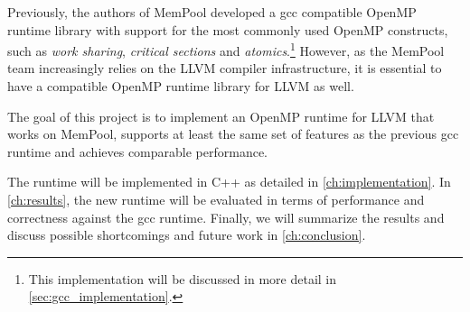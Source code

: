 Previously, the authors of MemPool developed a \gls{gcc} compatible OpenMP runtime library with
support for the most commonly used OpenMP constructs, such as \emph{work sharing}, \emph{critical
sections} and \emph{atomics}.\footnote{This implementation will be discussed in more detail in
\cref{sec:gcc_implementation}.} However, as the MemPool team increasingly relies on the LLVM
compiler infrastructure, it is essential to have a compatible OpenMP runtime library for LLVM as
well.

The goal of this project is to implement an OpenMP runtime for LLVM that works on MemPool, supports
at least the same set of features as the previous \gls{gcc} runtime and achieves comparable
performance.

The runtime will be implemented in C++ as detailed in \cref{ch:implementation}. In
\cref{ch:results}, the new runtime will be evaluated in terms of performance and correctness against
the \gls{gcc} runtime. Finally, we will summarize the results and discuss possible shortcomings and
future work in \cref{ch:conclusion}.

%
%
%
